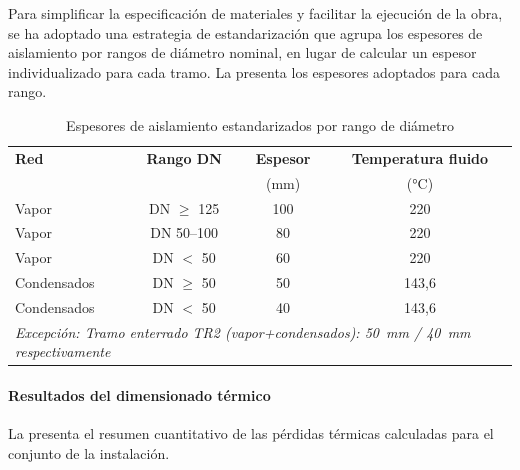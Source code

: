 Para simplificar la especificación de materiales y facilitar la ejecución de la obra, se ha adoptado una estrategia de estandarización que agrupa los espesores de aislamiento por rangos de diámetro nominal, en lugar de calcular un espesor individualizado para cada tramo. La  presenta los espesores adoptados para cada rango.

\begin{table}[H]
	\centering
	\caption{Espesores de aislamiento estandarizados por rango de diámetro}
	\label{tab:conclusiones-espesores-estandarizados}
	\begin{tabular}{lccc}
		\toprule
		\textbf{Red} & \textbf{Rango DN} & \textbf{Espesor} & \textbf{Temperatura fluido}                              \\
		             &                   & (mm)             & (°C)                                                     \\
		\midrule
		Vapor        & DN $\geq$ 125     & 100              & 220                                                      \\
		Vapor        & DN 50--100        & 80               & 220                                                      \\
		Vapor        & DN $<$ 50         & 60               & 220                                                      \\
		\midrule
		Condensados  & DN $\geq$ 50      & 50               & 143,6                                                    \\
		Condensados  & DN $<$ 50         & 40               & 143,6                                                    \\
		\midrule
		\multicolumn{4}{l}{\textit{Excepción: Tramo enterrado TR2 (vapor+condensados): 50~mm / 40~mm respectivamente}} \\
		\bottomrule
	\end{tabular}
\end{table}

\paragraph{Resultados del dimensionado térmico}

La  presenta el resumen cuantitativo de las pérdidas térmicas calculadas para el conjunto de la instalación.


